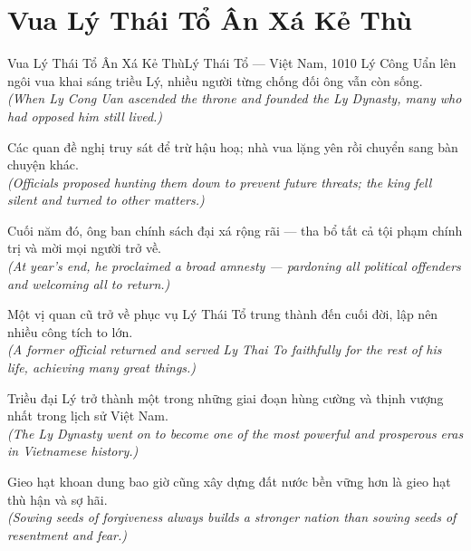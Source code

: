 \section{Vua Lý Thái Tổ Ân Xá Kẻ Thù}
\begin{truyen}{Vua Lý Thái Tổ Ân Xá Kẻ Thù}{Lý Thái Tổ --- Việt Nam, 1010}
 Lý Công Uẩn lên ngôi vua khai sáng triều Lý, nhiều người từng chống đối ông vẫn còn sống.\\[4pt]
\textit{(When Ly Cong Uan ascended the throne and founded the Ly Dynasty, many who had opposed him still lived.)}

Các quan đề nghị truy sát để trừ hậu hoạ; nhà vua lặng yên rồi chuyển sang bàn chuyện khác.\\[4pt]
\textit{(Officials proposed hunting them down to prevent future threats; the king fell silent and turned to other matters.)}

Cuối năm đó, ông ban chính sách đại xá rộng rãi --- tha bổ tất cả tội phạm chính trị và mời mọi người trở về.\\[4pt]
\textit{(At year's end, he proclaimed a broad amnesty --- pardoning all political offenders and welcoming all to return.)}

Một vị quan cũ trở về phục vụ Lý Thái Tổ trung thành đến cuối đời, lập nên nhiều công tích to lớn.\\[4pt]
\textit{(A former official returned and served Ly Thai To faithfully for the rest of his life, achieving many great things.)}

Triều đại Lý trở thành một trong những giai đoạn hùng cường và thịnh vượng nhất trong lịch sử Việt Nam.\\[4pt]
\textit{(The Ly Dynasty went on to become one of the most powerful and prosperous eras in Vietnamese history.)}

\end{truyen}
\begin{baihoc}
  Gieo hạt khoan dung bao giờ cũng xây dựng đất nước bền vững hơn là gieo hạt thù hận và sợ hãi.\\[4pt]
  \textit{(Sowing seeds of forgiveness always builds a stronger nation than sowing seeds of resentment and fear.)}
\end{baihoc}

